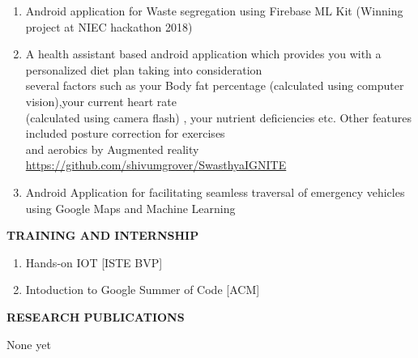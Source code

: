\documentclass[10pt]{article}
\begin{document}
\begin{minipage}{\textwidth}
{{\begin{enumerate}
\color{black} \item  Android application for Waste segregation using Firebase ML Kit (Winning project at NIEC hackathon 2018)
\color{black} \item  A health assistant based android application which provides you with a personalized diet plan taking into consideration\\ several factors such as your Body fat percentage (calculated using computer vision),your current heart rate\\ (calculated using camera flash) , your nutrient deficiencies etc. Other features included posture correction for exercises\\ and aerobics by Augmented reality\\
	\color{capri}\url{https://github.com/shivumgrover/SwasthyaIGNITE}

\color{black} \item Android Application for facilitating seamless traversal of emergency vehicles using Google Maps and Machine Learning\\




\end{enumerate}
}}
\end{minipage}


\begin{minipage}{\textwidth}
\vspace{5mm}
\begin{huge}
\textbf{\color{theme}TRAINING AND INTERNSHIP}
\end{huge}
\begin{mdframed}[backgroundcolor=theme]
\end{mdframed}

\vspace{1mm}

\color{black}\normalsize{{
\begin{enumerate}
\item Hands-on IOT [ISTE BVP]\\
\item Intoduction to Google Summer of Code [ACM]
\end{enumerate}
}}
\end{minipage}


\begin{minipage}{\textwidth}
\vspace{5mm}
\begin{huge}
\textbf{\color{theme}RESEARCH PUBLICATIONS}
\end{huge}
\begin{mdframed}[backgroundcolor=theme]
\end{mdframed}

\vspace{1mm}

\color{black}\normalsize{{
None yet

}}
\end{minipage}
\end{document}
